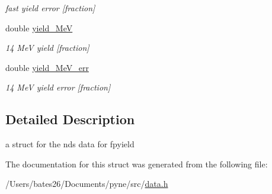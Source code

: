 \begin{DoxyCompactItemize}
\begin{DoxyCompactList}\small\item\em fast yield error \mbox{[}fraction\mbox{]} \end{DoxyCompactList}\item 
\hypertarget{structpyne_1_1ndsfpysub_afb3737be03fedddc6f54fa3a0e59f0e8}{double \hyperlink{structpyne_1_1ndsfpysub_afb3737be03fedddc6f54fa3a0e59f0e8}{yield\+\_\+Me\+V}}\label{structpyne_1_1ndsfpysub_afb3737be03fedddc6f54fa3a0e59f0e8}

\begin{DoxyCompactList}\small\item\em 14 Me\+V yield \mbox{[}fraction\mbox{]} \end{DoxyCompactList}\item 
\hypertarget{structpyne_1_1ndsfpysub_a7bc2487245689a3f6a095f2254e66e99}{double \hyperlink{structpyne_1_1ndsfpysub_a7bc2487245689a3f6a095f2254e66e99}{yield\+\_\+Me\+V\+\_\+err}}\label{structpyne_1_1ndsfpysub_a7bc2487245689a3f6a095f2254e66e99}

\begin{DoxyCompactList}\small\item\em 14 Me\+V yield error \mbox{[}fraction\mbox{]} \end{DoxyCompactList}\end{DoxyCompactItemize}


\subsection{Detailed Description}
a struct for the nds data for fpyield 

The documentation for this struct was generated from the following file\+:\begin{DoxyCompactItemize}
\item 
/\+Users/bates26/\+Documents/pyne/src/\hyperlink{data_8h}{data.\+h}\end{DoxyCompactItemize}
